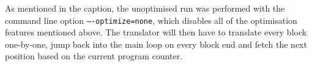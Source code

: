 As mentioned in the caption, the unoptimised run was performed with the command line option \texttt{----optimize=none}, which disables all of the optimisation features mentioned above.
The translator will then have to translate every block one-by-one, jump back into the main loop on every block end and fetch the next position based on the current program counter.






















